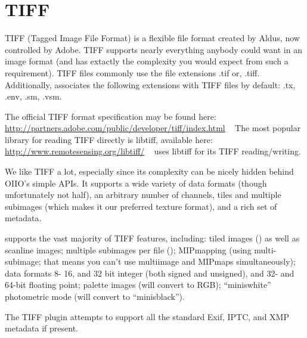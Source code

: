 \vspace{.25in}

\section{TIFF}
\label{sec:bundledplugins:tiff}

TIFF (Tagged Image File Format) is a flexible file format created by
Aldus, now controlled by Adobe.  TIFF supports nearly everything anybody
could want in an image format (and has extactly the complexity you would
expect from such a requirement).
TIFF files commonly use the file extensions {\cf .tif} or, {\cf .tiff}.
Additionally, \product associates the following extensions with TIFF
files by default: {\cf .tx}, {\cf .env}, {\cf .sm}, {\cf .vsm}.

The official TIFF format specification may be found here:
\url{http://partners.adobe.com/public/developer/tiff/index.html} 
~ The most popular library for reading TIFF directly is {\cf libtiff},
available here: 
\url{http://www.remotesensing.org/libtiff/} ~ \product uses {\cf libtiff}
for its TIFF reading/writing.

We like TIFF a lot, especially since its complexity can be nicely hidden
behind OIIO's simple APIs.  It supports a wide variety of data formats
(though unfortunately not {\cf half}), an arbitrary number of channels,
tiles and multiple subimages (which makes it our preferred texture
format), and a rich set of metadata.

\product supports the vast majority of TIFF features, including: tiled
images () as well as scanline images; multiple subimages per
file (); MIPmapping (using multi-subimage; that means 
you can't use multiimage and MIPmaps simultaneously); data formats
8- 16, and 32 bit integer (both signed and unsigned), and 32- and 64-bit
floating point; palette images (will convert to RGB); ``miniswhite''
photometric mode (will convert to ``minisblack'').

The TIFF plugin attempts to support all the standard Exif, IPTC, and XMP
metadata if present.

\vspace{.125in}

